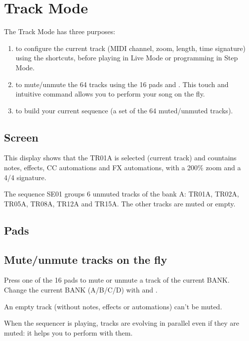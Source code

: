 \chapter{Track Mode}

The Track Mode has three purposes:

\begin{enumerate}
\item to configure the current track (MIDI channel, zoom, length, time signature) using the shortcuts, before playing in Live Mode or programming in Step Mode.
\item to mute/unmute the 64 tracks using the 16 pads and \btn{<} \btn{>}. This touch and intuitive command allows you to perform your song on the fly.
\item to build your current sequence (a set of the 64 muted/unmuted tracks).
\end{enumerate}


\section{Screen}


This display shows that the TR01A is selected (current track) and countains notes, effects, CC automations and FX automations, with a 200\% zoom and a 4/4 signature.

The sequence SE01 groups 6 unmuted tracks of the bank A: TR01A, TR02A, TR05A, TR08A, TR12A and TR15A. The other tracks are muted or empty.


\section{Pads}



\section{Mute/unmute tracks on the fly}

Press one of the 16 pads \padsicon{} to mute or unmute a track of the current BANK. Change the current BANK (A/B/C/D) with \btn{<} and \btn{>}.

An empty track (without notes, effects or automations) can't be muted.

When the sequencer is playing, tracks are evolving in parallel even if they are muted: it helps you to perform with them.


